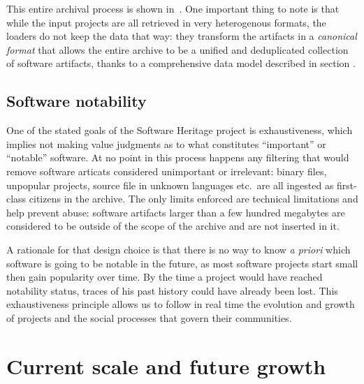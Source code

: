 This entire archival process is shown in~. One
important thing to note is that while the input projects are all retrieved in
very heterogenous formats, the loaders do not keep the data that way: they
transform the artifacts in a \emph{canonical format} that allows the entire
archive to be a unified and deduplicated collection of software artifacts,
thanks to a comprehensive data model described in section \TODO{}.

\subsection{Software notability}

One of the stated goals of the Software Heritage project is exhaustiveness,
which implies not making value judgments as to what constitutes ``important''
or ``notable'' software. At no point in this process happens any filtering that
would remove software articats considered unimportant or irrelevant: binary
files, unpopular projects, source file in unknown languages etc.\ are all
ingested as first-class citizens in the archive. The only limits enforced are
technical limitations and help prevent abuse: software artifacts larger than a
few hundred megabytes are considered to be outside of the scope of the archive
and are not inserted in it.

A rationale for that design choice is that there is no way to know \emph{a
priori} which software is going to be notable in the future, as most software
projects start small then gain popularity over time. By the time a project
would have reached notability status, traces of his past history could have
already been lost. This exhaustiveness principle allows us to follow in real
time the evolution and growth of projects and the social processes that govern
their communities.

\section{Current scale and future growth}

